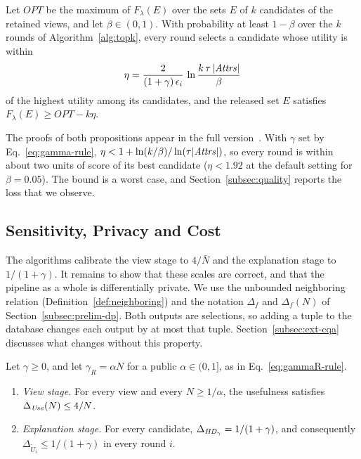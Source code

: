\begin{proposition}
\label{prop:utility}
Let $\mathit{OPT}$ be the maximum of $F_\lambda(E)$ over the sets $E$ of $k$ candidates of the retained views, and let $\beta\in(0,1)$.
With probability at least $1-\beta$ over the $k$ rounds of Algorithm~\ref{alg:topk}, every round selects a candidate whose utility is within
\[
\eta=\frac{2}{(1+\gamma)\,\epsilon_i}\,\ln\frac{k\,\tau\,|\mathit{Attrs}|}{\beta}
\]
of the highest utility among its candidates, and the released set $E$ satisfies $F_\lambda(E)\ge \mathit{OPT}-k\eta$.
\end{proposition}

The proofs of both propositions appear in \ifpaper the full version~\cite{fullversion}\else {}\fi.
With $\gamma$ set by Eq.~\eqref{eq:gamma-rule}, $\eta<1+\ln(k/\beta)/\ln(\tau|\mathit{Attrs}|)$, so every round is within about two units of score of its best candidate ($\eta<1.92$ at the default setting for $\beta=0.05$).
The bound is a worst case, and Section~\ref{subsec:quality} reports the loss that we observe.

\subsection{Sensitivity, Privacy and Cost}
\label{subsec:dp-proof}\label{subsec:ideal-sensitivity}

The algorithms calibrate the view stage to $4/\bar N$ and the explanation stage to $1/(1+\gamma)$.
It remains to show that these scales are correct, and that the pipeline as a whole is differentially private.
We use the unbounded neighboring relation (Definition~\ref{def:neighboring}) and the notation $\Delta_f$ and $\Delta_f(N)$ of Section~\ref{subsec:prelim-dp}.
Both outputs are selections, so adding a tuple to the database changes each output by at most that tuple.
Section~\ref{subsec:ext-cqa} discusses what changes without this property.

\begin{proposition}
\label{prop:stage-sensitivity}
Let $\gamma\ge0$, and let $\gamma_R=\alpha N$ for a public $\alpha\in(0,1]$, as in Eq.~\eqref{eq:gammaR-rule}.
\begin{enumerate}[label=(\arabic*),leftmargin=*]
\item \emph{View stage.} For every view and every $N\ge1/\alpha$, the usefulness satisfies $\Delta_{\mathit{Use}}(N)\le 4/N$.
\item \emph{Explanation stage.} For every candidate, $\Delta_{\mathit{HD}_\gamma}=1/(1+\gamma)$, and consequently $\Delta_{\widetilde U_i}\le 1/(1+\gamma)$ in every round $i$.
\end{enumerate}
\end{proposition}


